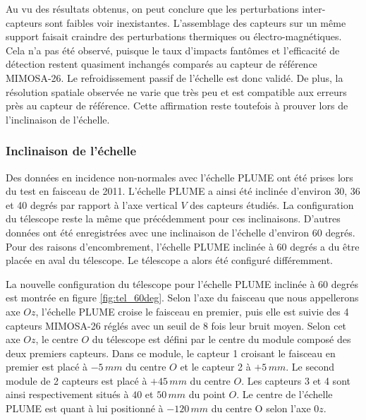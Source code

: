    \medskip

   Au vu des r\'esultats obtenus, on peut conclure que les perturbations inter-capteurs sont faibles voir inexistantes. L'assemblage des capteurs sur un m\^eme support faisait craindre des perturbations thermiques ou \'electro-magn\'etiques. Cela n'a pas \'et\'e observ\'e, puisque le taux d'impacts fant\^omes et l'efficacit\'e de d\'etection restent quasiment inchang\'es compar\'es au capteur de r\'ef\'erence MIMOSA-26. Le refroidissement passif de l'\'echelle est donc valid\'e. De plus, la r\'esolution spatiale observ\'ee ne varie que tr\`es peu et est compatible aux erreurs pr\`es au capteur de r\'ef\'erence. Cette affirmation reste toutefois \`a prouver lors de l'inclinaison de l'\'echelle.
   
  \subsubsection{Inclinaison de l'échelle}
  
  Des donn\'ees en incidence non-normales avec l'\'echelle PLUME ont \'et\'e prises lors du test en faisceau de 2011. L'\'echelle PLUME a ainsi \'et\'e inclin\'ee d'environ 30, 36 et 40 degr\'es par rapport \`a l'axe vertical $V$ des capteurs \'etudi\'es. La configuration du t\'elescope reste la m\^eme que pr\'ec\'edemment pour ces inclinaisons. D'autres donn\'ees ont \'et\'e enregistr\'ees avec une inclinaison de l'\'echelle d'environ 60 degr\'es. Pour des raisons d'encombrement, l'\'echelle PLUME inclin\'ee \`a 60 degr\'es a du \^etre plac\'ee en aval du t\'elescope. Le t\'elescope a alors \'et\'e configur\'e diff\'eremment.
  
  \medskip
  
  La nouvelle configuration du t\'elescope pour l'\'echelle PLUME inclin\'ee \`a 60 degr\'es est montr\'ee en figure \ref{fig:tel_60deg}. Selon l'axe du faisceau que nous appellerons axe $Oz$, l'\'echelle PLUME croise le faisceau en premier, puis elle est suivie des 4 capteurs MIMOSA-26 r\'egl\'es avec un seuil de 8 fois leur bruit moyen. Selon cet axe $Oz$, le centre $O$ du t\'elescope est d\'efini par le centre du module compos\'e des deux premiers capteurs. Dans ce module, le capteur 1 croisant le faisceau en premier est plac\'e \`a $-5 \, mm$ du centre $O$ et le capteur 2 \`a $+5 \, mm$. Le second module de 2 capteurs est plac\'e \`a $+45 \, mm$ du centre $O$. Les capteurs 3 et 4 sont ainsi respectivement situ\'es \`a $40$ et $50 \, mm$ du point $O$. Le centre de l'\'echelle PLUME est quant \`a lui positionn\'e \`a $-120 \, mm$ du centre O selon l'axe $0z$. 

